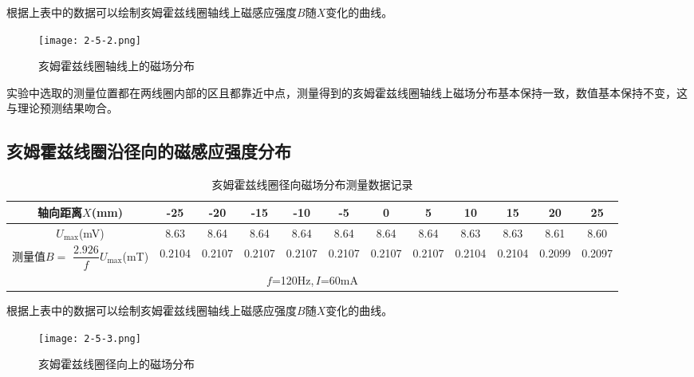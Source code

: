 \documentclass[12pt]{article}
\begin{document}
根据上表中的数据可以绘制亥姆霍兹线圈轴线上磁感应强度$B$随$X$变化的曲线。

\begin{figure}[h!]
    \centering
    \texttt{[image: 2-5-2.png]}
    \caption{亥姆霍兹线圈轴线上的磁场分布}
\end{figure}

实验中选取的测量位置都在两线圈内部的区且都靠近中点，测量得到的亥姆霍兹线圈轴线上磁场分布基本保持一致，数值基本保持不变，这与理论预测结果吻合。

\subsection{亥姆霍兹线圈沿径向的磁感应强度分布}

\begin{table}[htbp]
    \centering
    \begin{tabular}{|c|c|c|c|c|c|c|c|c|c|c|c|}
    \hline
    轴向距离$X$(mm) & -25  & -20  & -15  & -10  & -5   & 0    & 5    & 10   & 15   & 20   & 25 \\
    \hline
    $U_{\max}$(mV) & 8.63  & 8.64  & 8.64  & 8.64  & 8.64  & 8.64  & 8.64  & 8.63  & 8.63  & 8.61  & 8.60  \\
    \hline
    \makecell{测量值$B=$ \\ $\dfrac{2.926}{f}U_{\max}$(mT)}  & 0.2104  & 0.2107  & 0.2107  & 0.2107  & 0.2107  & 0.2107  & 0.2107  & 0.2104  & 0.2104  & 0.2099  & 0.2097  \\
    \hline
    \multicolumn{12}{|c|}{$f$=120Hz,\,$I$=60mA} \\
    \hline
    \end{tabular}%
    \caption{亥姆霍兹线圈径向磁场分布测量数据记录}
\end{table}%

根据上表中的数据可以绘制亥姆霍兹线圈轴线上磁感应强度$B$随$X$变化的曲线。

\begin{figure}[htbp]
    \centering
    \texttt{[image: 2-5-3.png]}
    \caption{亥姆霍兹线圈径向上的磁场分布}
\end{figure}
\end{document}
